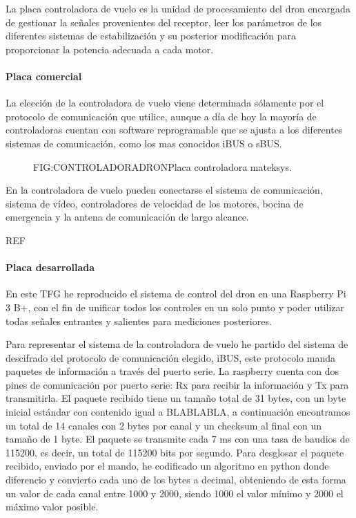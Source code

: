 
	La placa controladora de vuelo es la unidad de procesamiento del dron encargada de gestionar la señales provenientes del receptor, leer los parámetros de los diferentes sistemas de estabilización y su posterior modificación para proporcionar la potencia adecuada a cada motor.
\paragraph{Placa comercial}
	La elección de la controladora de vuelo viene determinada sólamente por el protocolo de comunicación que utilice, aunque a día de hoy la mayoría de controladoras cuentan con software reprogramable que se ajusta a los diferentes sistemas de comunicación, como los mas conocidos iBUS o sBUS.
	
	\begin{figure}{FIG:CONTROLADORADRON}{Placa controladora mateksys.}
\end{figure}

	En la controladora de vuelo pueden conectarse el sistema de comunicación, sistema de vídeo, controladores de velocidad de los motores, bocina de emergencia y la antena de comunicación de largo alcance.

REF %

\paragraph{Placa desarrollada}
	En este TFG he reproducido el sistema de control del dron en una Raspberry Pi 3 B+, con el fin de unificar todos los controles en un solo punto y poder utilizar todas señales entrantes y salientes para mediciones posteriores.
	
	Para representar el sistema de la controladora de vuelo he partido del sistema de descifrado del protocolo de comunicación elegido, iBUS, este protocolo manda paquetes de información a través del puerto serie. La raspberry cuenta con dos pines de comunicación por puerto serie: Rx para recibir la información y Tx para transmitirla.
El paquete recibido tiene un tamaño total de 31 bytes, con un byte inicial estándar con contenido igual a BLABLABLA, a continuación encontramos un total de 14 canales con 2 bytes por canal y un checksum al final con un tamaño de 1 byte. El paquete se transmite cada 7 ms con una tasa de baudios de 115200, es decir, un total de 115200 bits por segundo.
Para desglosar el paquete recibido, enviado por el mando, he codificado un algoritmo en python donde diferencio y convierto cada uno de los bytes a decimal, obteniendo de esta forma un valor de cada canal entre 1000 y 2000, siendo 1000 el valor mínimo y 2000 el máximo valor posible.

